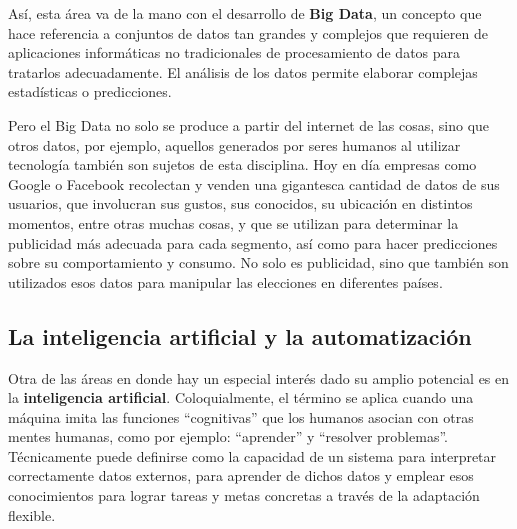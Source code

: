 Así, esta área va de la mano con el desarrollo de \textbf{Big Data}, un concepto
que hace referencia a conjuntos de datos tan grandes y complejos que requieren
de  aplicaciones informáticas no tradicionales de procesamiento de datos para 
tratarlos adecuadamente. El análisis de los datos permite elaborar complejas
estadísticas o predicciones.\autocite[vid.]{warden_2011}

Pero el Big Data no solo se produce a partir del internet de las cosas, sino que
otros datos, por ejemplo, aquellos generados por seres humanos al utilizar tecnología
también son sujetos de esta disciplina. Hoy en día empresas como Google o Facebook
recolectan y venden una gigantesca cantidad de datos de sus usuarios, que involucran
sus gustos, sus conocidos, su ubicación en distintos momentos, entre otras muchas
cosas, y que se utilizan para determinar la publicidad más adecuada para cada
segmento, así como para hacer predicciones sobre su comportamiento y consumo.
No solo es publicidad, sino que también son utilizados esos datos para manipular
las elecciones en diferentes países.\autocite{perfil_2018_03_20}

\subsection{La inteligencia artificial y la automatización}

Otra de las áreas en donde hay un especial interés dado su amplio potencial
es en la \textbf{inteligencia artificial}. Coloquialmente, el término se aplica
cuando una máquina imita las funciones ``cognitivas'' que los humanos asocian
con otras mentes humanas, como por ejemplo: ``aprender'' y ``resolver problemas''.
Técnicamente puede definirse como la capacidad de un sistema para interpretar
correctamente datos externos, para aprender de dichos datos y emplear esos
conocimientos para lograr tareas y metas concretas a través de la adaptación
flexible.\autocite{kaplan_2019}

